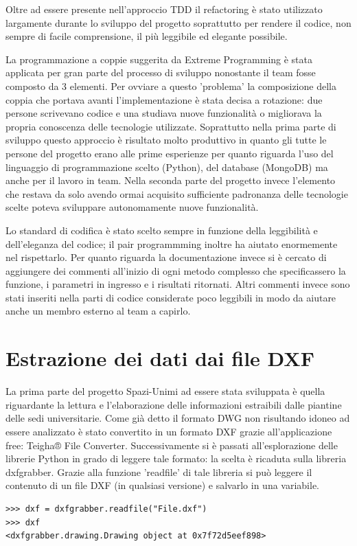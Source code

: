 \documentclass[12pt]{report}
\begin{document}
Oltre ad essere presente nell'approccio TDD il refactoring è stato utilizzato largamente durante lo sviluppo del progetto soprattutto per rendere il codice, non sempre di facile comprensione, il più leggibile ed elegante possibile.

La programmazione a coppie suggerita da Extreme Programming è stata applicata per gran parte del processo di sviluppo nonostante il team fosse composto da 3 elementi. Per ovviare a questo 'problema' la composizione della coppia che portava avanti l'implementazione è stata decisa a rotazione: due persone scrivevano codice e una studiava nuove funzionalità o migliorava la propria conoscenza delle tecnologie utilizzate. Soprattutto nella prima parte di sviluppo questo approccio è risultato molto produttivo in quanto gli tutte le persone del progetto erano alle prime esperienze per quanto riguarda l'uso del linguaggio di programmazione scelto (Python), del database (MongoDB) ma anche per il lavoro in team. Nella seconda parte del progetto invece l'elemento che restava da solo avendo ormai acquisito sufficiente padronanza delle tecnologie scelte poteva sviluppare autonomamente nuove funzionalità.

Lo standard di codifica è stato scelto sempre in funzione della leggibilità e dell'eleganza del codice; il pair programmming inoltre ha aiutato enormemente nel rispettarlo. Per quanto riguarda la documentazione invece si è cercato di aggiungere dei commenti all'inizio di ogni metodo complesso che specificassero la funzione, i parametri in ingresso e i risultati ritornati. Altri commenti invece sono stati inseriti nella parti di codice considerate poco leggibili in modo da aiutare anche un membro esterno al team a capirlo.   

\newpage
\section{Estrazione dei dati dai file DXF}

La prima parte del progetto Spazi-Unimi ad essere stata sviluppata è quella riguardante la lettura e l'elaborazione delle informazioni estraibili dalle piantine delle sedi universitarie. Come già detto il formato DWG non risultando idoneo ad essere analizzato è stato convertito in un formato DXF grazie all'applicazione free: Teigha® File Converter. 
Successivamente si è passati all'esplorazione delle librerie Python in grado di leggere tale formato: la scelta è ricaduta sulla libreria dxfgrabber. Grazie alla funzione 'readfile' di tale libreria si può leggere il contenuto di un file DXF (in qualsiasi versione) e salvarlo in una variabile.
\begin{lstlisting}[label=codice,caption=Lettura di un file DXF con dxfgrabber, frame=single]
>>> dxf = dxfgrabber.readfile("File.dxf")
>>> dxf
<dxfgrabber.drawing.Drawing object at 0x7f72d5eef898>
\end{lstlisting}
\end{document}
